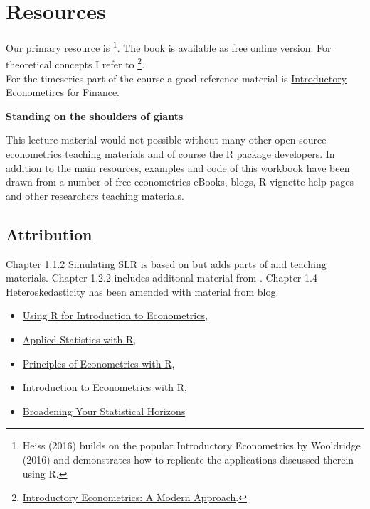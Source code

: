 \documentclass[]{book}
\providecommand{\tightlist}{%
  \setlength{\itemsep}{0pt}\setlength{\parskip}{0pt}}
\let\rmarkdownfootnote\footnote%
\def\footnote{\protect\rmarkdownfootnote}
\begin{document}
\hypertarget{resources}{%
\section*{Resources}\label{resources}}

Our primary resource is \citet{heiss2016using} \footnote{Heiss (2016)
  builds on the popular Introductory Econometrics by Wooldridge (2016)
  and demonstrates how to replicate the applications discussed therein
  using R.}. The book is available as free
\href{http://www.urfie.net/read.html}{online} version. For theoretical
concepts I refer to \citet{wooldridge2015introductory}\footnote{\href{https://books.google.ee/books/about/Introductory_Econometrics_A_Modern_Appro.html?id=wUF4BwAAQBAJ\&source=kp_cover\&redir_esc=y}{Introductory
  Econometrics: A Modern Approach}.}.\\
For the timeseries part of the course a good reference material is
\href{https://www.cambridge.org/pt/academic/subjects/economics/finance/introductory-econometrics-finance-3rd-edition?format=PB\&isbn=9781107661455}{Introductory
Econometircs for Finance}.

\textbf{Standing on the shoulders of giants}

This lecture material would not possible without many other open-source
econometrics teaching materials and of course the R package developers.
In addition to the main resources, examples and code of this workbook
have been drawn from a number of free econometrics eBooks, blogs,
R-vignette help pages and other researchers teaching materials.

\hypertarget{attribution}{%
\subsection*{Attribution}\label{attribution}}

Chapter 1.1.2 Simulating SLR is based on \citet{heiss2016using} but adds
parts of \citet{dalpiaz2016} and \citet{colonescu2018} teaching
materials. Chapter 1.2.2 includes additonal material from
\citet{Hanck2018}. Chapter 1.4 Heteroskedasticity has been amended with
material from \citet{Rodrigues2018} blog.

\begin{itemize}
\tightlist
\item
  \href{https://emwikts1970.github.io/URFITE-Bookdown/}{Using R for
  Introduction to Econometrics}, \citet{Hanck2018}
\item
  \href{https://daviddalpiaz.github.io/appliedstats/}{Applied Statistics
  with R}, \citet{dalpiaz2016}
\item
  \href{https://bookdown.org/ccolonescu/RPoE4/}{Principles of
  Econometrics with R}, \citet{colonescu2018}
\item
  \href{https://scpoecon.github.io/ScPoEconometrics/}{Introduction to
  Econometrics with R}, \citet{oswald2018introduction}
\item
  \href{https://bookdown.org/roback/bookdown-bysh/}{Broadening Your
  Statistical Horizons}
\end{itemize}
\end{document}
